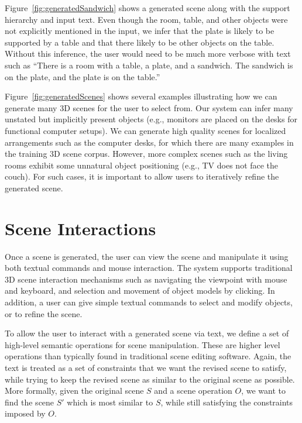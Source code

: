 \documentclass{sigchi}
\begin{document}
Figure~\ref{fig:generatedSandwich} shows a generated scene along with the support hierarchy and input text.  Even though the room, table, and other objects were not explicitly mentioned in the input, we infer that the plate is likely to be supported by a table and that there likely to be other objects on the table.  Without this inference, the user would need to be much more verbose with text such as ``There is a room with a table, a plate, and a sandwich.  The sandwich is on the plate, and the plate is on the table.''  

Figure~\ref{fig:generatedScenes} shows several examples illustrating how we can generate many 3D scenes for the user to select from.  Our system can infer many unstated but implicitly present objects (e.g., monitors are placed on the desks for functional computer setups).  We can generate high quality scenes for localized arrangements such as the computer desks, for which there are many examples in the training 3D scene corpus.  However, more complex scenes such as the living rooms exhibit some unnatural object positioning (e.g., TV does not face the couch).  For such cases, it is important to allow users to iteratively refine the generated scene.


\section{Scene Interactions}
\label{sec:sceneOperations}

Once a scene is generated, the user can view the scene and manipulate it using both textual commands and mouse interaction.  The system supports traditional 3D scene interaction mechanisms such as navigating the viewpoint with mouse and keyboard, and selection and movement of object models by clicking.  In addition, a user can give simple textual commands to select and modify objects, or to refine the scene.

To allow the user to interact with a generated scene via text, we define a set of high-level semantic operations for scene manipulation.  These are higher level operations than typically found in traditional scene editing software.  Again, the text is treated as a set of constraints that we want the revised scene to satisfy, while trying to keep the revised scene as similar to the original scene as possible.  More formally, given the original scene $S$ and a scene operation $O$, we want to find the scene $S'$ which is most similar to $S$, while still satisfying the constraints imposed by $O$.
\end{document}
